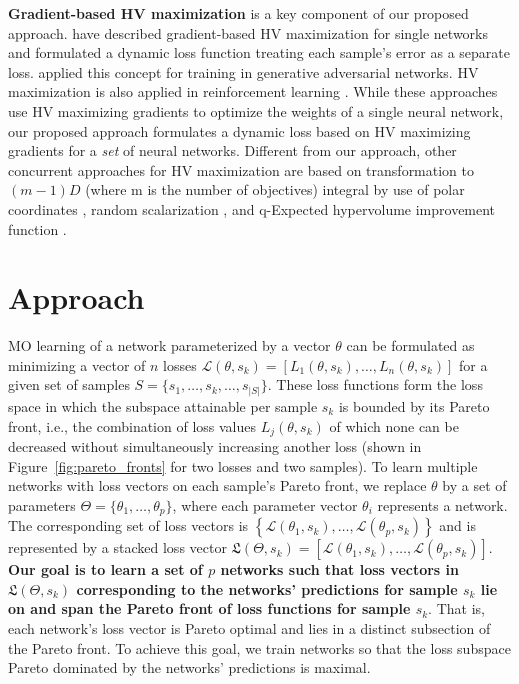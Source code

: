 \textbf{Gradient-based HV maximization} is a key component of our proposed approach. \cite{miranda2016single} have described gradient-based HV maximization for single networks and formulated a dynamic loss function treating each sample's error as a separate loss. \cite{albuquerque2019multi} applied this concept for training in generative adversarial networks. HV maximization is also applied in reinforcement learning \citep{van2014multi,xu2020prediction}. While these approaches use HV maximizing gradients to optimize the weights of a single neural network, our proposed approach formulates a dynamic loss based on HV maximizing gradients for a \emph{set} of neural networks. Different from our approach, other concurrent approaches for HV maximization are based on transformation to $(m-1)D$ (where m is the number of objectives) integral by use of polar coordinates \cite{deng2019approximating}, random scalarization \citep{golovin2020random}, and q-Expected hypervolume improvement function \citep{daulton2020differentiable}.\section{Approach}
\label{sec:approach}
MO learning of a network parameterized by a vector $\theta$ can be formulated as minimizing a vector of $n$ losses $\mathcal{L}(\theta,s_{k})=\left[L_{1}(\theta,s_{k}),\dots,L_{n}(\theta,s_{k})\right]$ for a given set of samples $S = \{s_{1},\dots, s_{k},\dots, s_{|S|}\}$. These loss functions form the loss space in which the subspace attainable per sample $s_{k}$ is bounded by its Pareto front, i.e., the combination of loss values $L_{j}(\theta,s_{k})$ of which none can be decreased without simultaneously increasing another loss (shown in Figure~\ref{fig:pareto_fronts} for two losses and two samples).
To learn multiple networks with loss vectors on each sample's Pareto front, we replace $\theta$ by a set of parameters $\Theta = \{\theta_{1},\dots,\theta_{p} \}$, where each parameter vector $\theta_{i}$ represents a network. The corresponding set of loss vectors is $\left\{\mathcal{L}(\theta_{1},s_{k}),\dots,\mathcal{L}(\theta_{p},s_{k}) \right\}$ and is represented by a stacked loss vector $\mathfrak{L}(\Theta,s_{k})=\left[\mathcal{L}(\theta_{1},s_{k}),\dots,\mathcal{L}(\theta_{p},s_{k}) \right]$.
\textbf{Our goal is to learn a set of $p$ networks such that loss vectors in $\mathfrak{L}(\Theta,s_{k})$ corresponding to the networks' predictions for sample $s_{k}$ lie on and span the Pareto front of loss functions for sample $s_{k}$}. That is, each network's loss vector is Pareto optimal and lies in a distinct subsection of the Pareto front. To achieve this goal, we train networks so that the loss subspace Pareto dominated by the networks' predictions is maximal.

